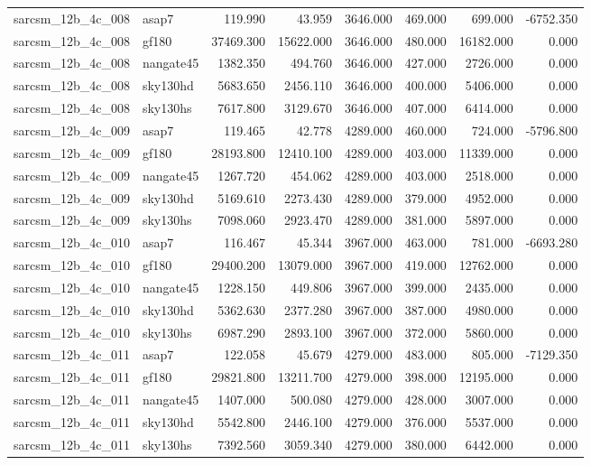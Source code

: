 \begin{tabular}{llrrrrrr}
sarcsm\_12b\_4c\_008 & asap7 & 119.990 & 43.959 & 3646.000 & 469.000 & 699.000 & -6752.350 \\
sarcsm\_12b\_4c\_008 & gf180 & 37469.300 & 15622.000 & 3646.000 & 480.000 & 16182.000 & 0.000 \\
sarcsm\_12b\_4c\_008 & nangate45 & 1382.350 & 494.760 & 3646.000 & 427.000 & 2726.000 & 0.000 \\
sarcsm\_12b\_4c\_008 & sky130hd & 5683.650 & 2456.110 & 3646.000 & 400.000 & 5406.000 & 0.000 \\
sarcsm\_12b\_4c\_008 & sky130hs & 7617.800 & 3129.670 & 3646.000 & 407.000 & 6414.000 & 0.000 \\
sarcsm\_12b\_4c\_009 & asap7 & 119.465 & 42.778 & 4289.000 & 460.000 & 724.000 & -5796.800 \\
sarcsm\_12b\_4c\_009 & gf180 & 28193.800 & 12410.100 & 4289.000 & 403.000 & 11339.000 & 0.000 \\
sarcsm\_12b\_4c\_009 & nangate45 & 1267.720 & 454.062 & 4289.000 & 403.000 & 2518.000 & 0.000 \\
sarcsm\_12b\_4c\_009 & sky130hd & 5169.610 & 2273.430 & 4289.000 & 379.000 & 4952.000 & 0.000 \\
sarcsm\_12b\_4c\_009 & sky130hs & 7098.060 & 2923.470 & 4289.000 & 381.000 & 5897.000 & 0.000 \\
sarcsm\_12b\_4c\_010 & asap7 & 116.467 & 45.344 & 3967.000 & 463.000 & 781.000 & -6693.280 \\
sarcsm\_12b\_4c\_010 & gf180 & 29400.200 & 13079.000 & 3967.000 & 419.000 & 12762.000 & 0.000 \\
sarcsm\_12b\_4c\_010 & nangate45 & 1228.150 & 449.806 & 3967.000 & 399.000 & 2435.000 & 0.000 \\
sarcsm\_12b\_4c\_010 & sky130hd & 5362.630 & 2377.280 & 3967.000 & 387.000 & 4980.000 & 0.000 \\
sarcsm\_12b\_4c\_010 & sky130hs & 6987.290 & 2893.100 & 3967.000 & 372.000 & 5860.000 & 0.000 \\
sarcsm\_12b\_4c\_011 & asap7 & 122.058 & 45.679 & 4279.000 & 483.000 & 805.000 & -7129.350 \\
sarcsm\_12b\_4c\_011 & gf180 & 29821.800 & 13211.700 & 4279.000 & 398.000 & 12195.000 & 0.000 \\
sarcsm\_12b\_4c\_011 & nangate45 & 1407.000 & 500.080 & 4279.000 & 428.000 & 3007.000 & 0.000 \\
sarcsm\_12b\_4c\_011 & sky130hd & 5542.800 & 2446.100 & 4279.000 & 376.000 & 5537.000 & 0.000 \\
sarcsm\_12b\_4c\_011 & sky130hs & 7392.560 & 3059.340 & 4279.000 & 380.000 & 6442.000 & 0.000 \\

\end{tabular}
